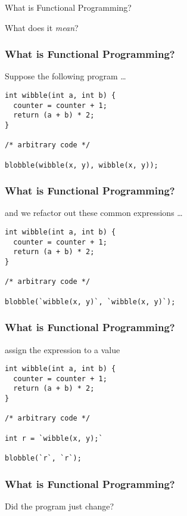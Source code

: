 \begin{frame}
\begin{center}
What is Functional Programming?
\end{center}
\begin{center}
What does it \emph{mean}?
\end{center}
\end{frame}

\begin{frame}[fragile]
\frametitle{What is Functional Programming?}
\begin{block}{Suppose the following program \ldots}
\begin{lstlisting}[style=java]
int wibble(int a, int b) {
  counter = counter + 1;
  return (a + b) * 2;
}

/* arbitrary code */

blobble(wibble(x, y), wibble(x, y));
\end{lstlisting}
\end{block}
\end{frame}

\begin{frame}[fragile]
\frametitle{What is Functional Programming?}
\begin{block}{and we refactor out these common expressions \ldots}
\begin{lstlisting}[style=java]
int wibble(int a, int b) {
  counter = counter + 1;
  return (a + b) * 2;
}

/* arbitrary code */

blobble(`wibble(x, y)`, `wibble(x, y)`);
\end{lstlisting}
\end{block}
\end{frame}

\begin{frame}[fragile]
\frametitle{What is Functional Programming?}
\begin{block}{assign the expression to a value}
\begin{lstlisting}[style=java]
int wibble(int a, int b) {
  counter = counter + 1;
  return (a + b) * 2;
}

/* arbitrary code */

int r = `wibble(x, y);`

blobble(`r`, `r`);
\end{lstlisting}
\end{block}
\end{frame}

\begin{frame}[fragile]
\frametitle{What is Functional Programming?}
\begin{center}
Did the program just change?
\end{center}
\end{frame}


